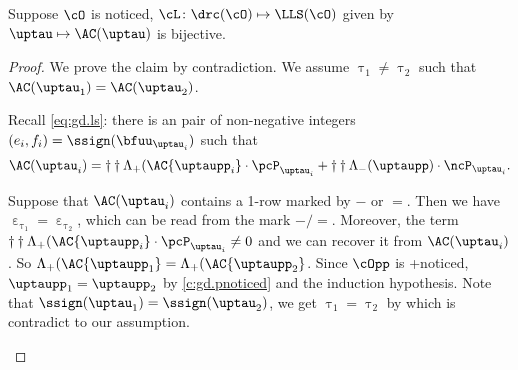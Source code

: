 \documentclass[ssunip]{subfiles}
\begin{document}
\begin{lem}\label{c:noticed.bij}
 Suppose $\cO$ is noticed, $\cL \colon \drc(\cO)\mapsto \LLS(\cO)$ given by
 $\uptau\mapsto \oAC{\uptau}$ is bijective.
\end{lem}
\begin{proof}
We prove the claim by contradiction. We assume $\uptau_{1}\neq \uptau_{2}$ such
that $\oAC{\uptau_{1}}=\oAC{\uptau_{2}}$.


Recall \eqref{eq:gd.ls}: there is an pair of non-negative integers
$(e_{i},f_{i})=\ssign(\bfuu_{\uptau_{i}})$ such that
\[
  \oAC{\uptau_{i}} = \dagger\dagger \Lambda_+(\AC{\uptaupp_{i}}\cdot \pcP_{\uptau_{i}}
  + \dagger\dagger \nAC{\uptaupp} \cdot \ncP_{\uptau_{i}}.
\]

\begin{enumPF}
  \item
Suppose that $\oAC{\uptau_{i}}$ contains a 1-row marked by $-$ or $=$. Then we
have
$\upepsilon_{\uptau_{1}}=\upepsilon_{\uptau_{2}}$, which can be read from the mark $-/=$.
Moreover, the term
$\dagger\dagger\Lambda_+(\AC{\uptaupp_{i}}\cdot \pcP_{\uptau_{i}}\neq 0$ and we can
recover it from $\oAC{\uptau_{i}}$. So $\Lambda_+(\AC{\uptaupp_{1}} = \Lambda_+(\AC{\uptaupp_{2}}$.
Since $\cOpp$ is +noticed, $\uptaupp_{1}=\uptaupp_{2}$ by
\eqref{c:gd.pnoticed} and the induction hypothesis.
Note that $\ssign(\uptau_{1})=\ssign(\uptau_{2})$, we get
$\uptau_{1}=\uptau_{2}$ by  which is contradict to our assumption.



\end{enumPF}
\end{proof}
\end{document}

